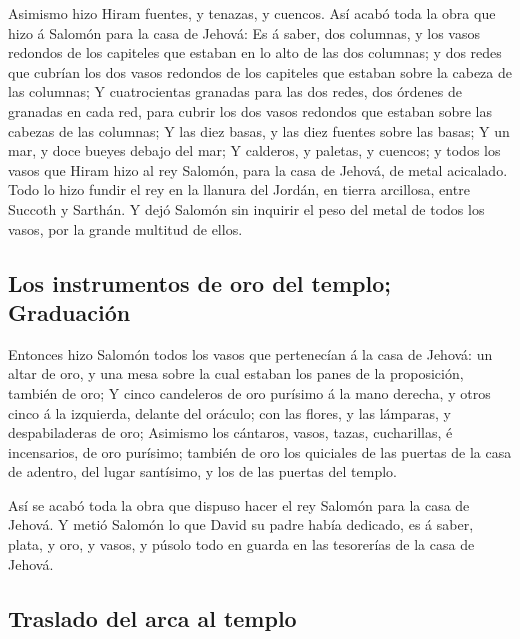  Asimismo hizo Hiram fuentes, y tenazas, y cuencos. Así
acabó toda la obra que hizo á Salomón para la casa de Jehová:
 Es á saber, dos columnas, y los vasos redondos de los
capiteles que estaban en lo alto de las dos columnas; y dos redes que
cubrían los dos vasos redondos de los capiteles que estaban sobre la
cabeza de las columnas;  Y cuatrocientas granadas para las
dos redes, dos órdenes de granadas en cada red, para cubrir los dos
vasos redondos que estaban sobre las cabezas de las columnas;
 Y las diez basas, y las diez fuentes sobre las basas;
 Y un mar, y doce bueyes debajo del mar;  Y
calderos, y paletas, y cuencos; y todos los vasos que Hiram hizo al rey
Salomón, para la casa de Jehová, de metal acicalado.  Todo
lo hizo fundir el rey en la llanura del Jordán, en tierra arcillosa,
entre Succoth y Sarthán.  Y dejó Salomón sin inquirir el
peso del metal de todos los vasos, por la grande multitud de ellos.

\hypertarget{los-instrumentos-de-oro-del-templo-graduaciuxf3n}{%
\subsection{Los instrumentos de oro del templo;
Graduación}\label{los-instrumentos-de-oro-del-templo-graduaciuxf3n}}

 Entonces hizo Salomón todos los vasos que pertenecían á la
casa de Jehová: un altar de oro, y una mesa sobre la cual estaban los
panes de la proposición, también de oro;  Y cinco
candeleros de oro purísimo á la mano derecha, y otros cinco á la
izquierda, delante del oráculo; con las flores, y las lámparas, y
despabiladeras de oro;  Asimismo los cántaros, vasos,
tazas, cucharillas, é incensarios, de oro purísimo; también de oro los
quiciales de las puertas de la casa de adentro, del lugar santísimo, y
los de las puertas del templo.

 Así se acabó toda la obra que dispuso hacer el rey Salomón
para la casa de Jehová. Y metió Salomón lo que David su padre había
dedicado, es á saber, plata, y oro, y vasos, y púsolo todo en guarda en
las tesorerías de la casa de Jehová.

\hypertarget{traslado-del-arca-al-templo}{%
\subsection{Traslado del arca al
templo}\label{traslado-del-arca-al-templo}}

